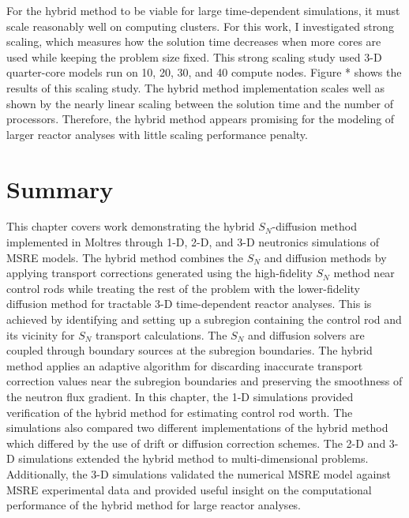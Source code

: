 For the hybrid method to be viable for large time-dependent simulations, it must scale reasonably
well on computing clusters. For this work, I investigated strong scaling, which measures how the
solution time decreases when more cores are used while keeping the problem size fixed. This strong
scaling study used 3-D quarter-core models run on 10, 20, 30, and 40 compute nodes.
Figure * shows the results of this scaling study.
The hybrid method implementation scales well as shown by the nearly linear scaling between the
solution time and the number of processors. Therefore, the hybrid method appears promising for the
modeling of larger reactor analyses with little scaling performance penalty.


\section{Summary}

This chapter covers work demonstrating the hybrid $S_N$-diffusion method implemented in Moltres
through 1-D, 2-D, and 3-D neutronics simulations of \gls{MSRE} models. The hybrid method combines
the $S_N$
and diffusion methods by applying transport corrections generated using the high-fidelity $S_N$
method near control rods while treating the rest of the problem with the lower-fidelity diffusion
method for tractable 3-D time-dependent reactor analyses. This is achieved by identifying and
setting up a subregion containing the control rod and its vicinity for $S_N$ transport
calculations. The $S_N$ and diffusion solvers are coupled through boundary sources at the subregion
boundaries. The hybrid method applies an adaptive algorithm for discarding inaccurate transport
correction values near the subregion boundaries and preserving the smoothness of the neutron flux
gradient. In this chapter, the 1-D simulations provided verification of the hybrid method for
estimating control rod worth. The simulations also compared two different implementations of the
hybrid method which differed by the use of drift or diffusion correction schemes.
The 2-D and 3-D simulations extended the hybrid method to multi-dimensional problems. Additionally,
the 3-D simulations validated the numerical \gls{MSRE} model against \gls{MSRE} experimental data
and provided useful insight on the computational performance of the hybrid method for
large reactor analyses.

